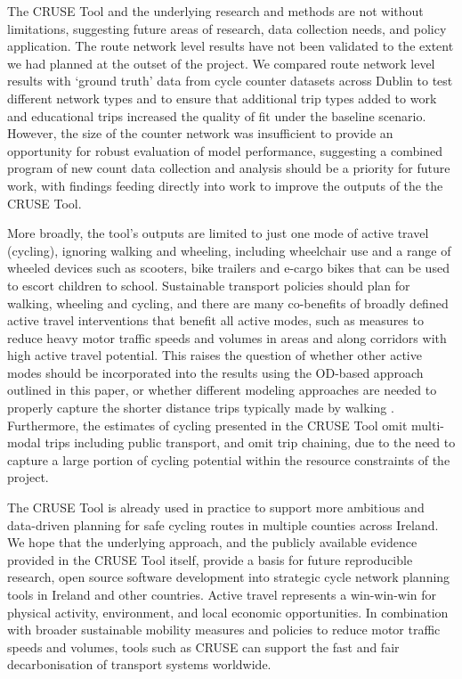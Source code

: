 \documentclass[
  super,
  preprint,
  3p]{elsarticle}
\begin{document}
The CRUSE Tool and the underlying research and methods are not without
limitations, suggesting future areas of research, data collection needs,
and policy application. The route network level results have not been
validated to the extent we had planned at the outset of the project. We
compared route network level results with `ground truth' data from cycle
counter datasets across Dublin to test different network types and to
ensure that additional trip types added to work and educational trips
increased the quality of fit under the baseline scenario. However, the
size of the counter network was insufficient to provide an opportunity
for robust evaluation of model performance, suggesting a combined
program of new count data collection and analysis should be a priority
for future work, with findings feeding directly into work to improve the
outputs of the the CRUSE Tool.

More broadly, the tool's outputs are limited to just one mode of active
travel (cycling), ignoring walking and wheeling, including wheelchair
use and a range of wheeled devices such as scooters, bike trailers and
e-cargo bikes that can be used to escort children to school. Sustainable
transport policies should plan for walking, wheeling and cycling, and
there are many co-benefits of broadly defined active travel
interventions that benefit all active modes, such as measures to reduce
heavy motor traffic speeds and volumes in areas and along corridors with
high active travel potential. This raises the question of whether other
active modes should be incorporated into the results using the OD-based
approach outlined in this paper, or whether different modeling
approaches are needed to properly capture the shorter distance trips
typically made by walking \citep{cooper2018}. Furthermore, the estimates
of cycling presented in the CRUSE Tool omit multi-modal trips including
public transport, and omit trip chaining, due to the need to capture a
large portion of cycling potential within the resource constraints of
the project.

The CRUSE Tool is already used in practice to support more ambitious and
data-driven planning for safe cycling routes in multiple counties across
Ireland. We hope that the underlying approach, and the publicly
available evidence provided in the CRUSE Tool itself, provide a basis
for future reproducible research, open source software development into
strategic cycle network planning tools in Ireland and other countries.
Active travel represents a win-win-win for physical activity,
environment, and local economic opportunities. In combination with
broader sustainable mobility measures and policies to reduce motor
traffic speeds and volumes, tools such as CRUSE can support the fast and
fair decarbonisation of transport systems worldwide.
\end{document}
